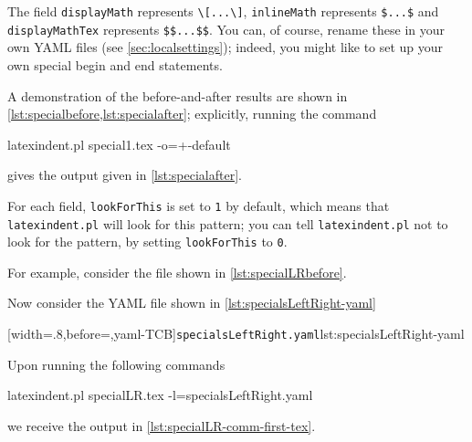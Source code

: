  The field \texttt{displayMath} represents \lstinline!\[...\]!, \texttt{inlineMath}
 represents \lstinline!$...$! and \texttt{displayMathTex} represents \lstinline!$$...$$!.
 You can, of course, rename these in your own YAML files (see \vref{sec:localsettings});
 indeed, you might like to set up your own special begin and end statements.

 \begin{example}
 A demonstration of the before-and-after results are shown in
 \cref{lst:specialbefore,lst:specialafter}; explicitly, running the command

 \begin{commandshell}
latexindent.pl special1.tex -o=+-default
 \end{commandshell}

 gives the output given in \cref{lst:specialafter}.

 \begin{cmhtcbraster}
 \end{cmhtcbraster}
 \end{example}

 For each field, \texttt{lookForThis} is set to \texttt{1} by default, which means that
 \texttt{latexindent.pl} will look for this pattern; you can tell \texttt{latexindent.pl}
 not to look for the pattern, by setting \texttt{lookForThis} to \texttt{0}.

 \begin{example}
 For example, consider the file shown in \cref{lst:specialLRbefore}.%


 Now consider the YAML file shown in \cref{lst:specialsLeftRight-yaml}

 \begin{cmhtcbraster}
  [width=.8\linewidth,before=\centering,yaml-TCB]{\texttt{specialsLeftRight.yaml}}{lst:specialsLeftRight-yaml}
 \end{cmhtcbraster}

 Upon running the following commands 
 \begin{widepage}

  \begin{commandshell}
latexindent.pl specialLR.tex -l=specialsLeftRight.yaml      
\end{commandshell}

 \end{widepage}
 we receive the output in \cref{lst:specialLR-comm-first-tex}.


 \end{example}

